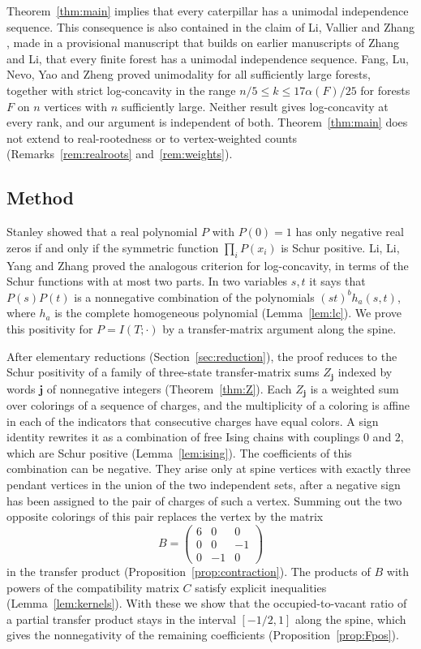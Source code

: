 \documentclass{amsart}
\theoremstyle{definition}
\theoremstyle{remark}
\numberwithin{equation}{section}
\newcommand{\jj}{\mathbf{j}}
\begin{document}
Theorem~\ref{thm:main} implies that every caterpillar has a unimodal independence sequence. This consequence is also contained in the claim of Li, Vallier and Zhang \cite{LVZ}, made in a provisional manuscript that builds on earlier manuscripts of Zhang and Li, that every finite forest has a unimodal independence sequence. Fang, Lu, Nevo, Yao and Zheng \cite{FLNYZ} proved unimodality for all sufficiently large forests, together with strict log-concavity in the range $n/5\le k\le17\alpha(F)/25$ for forests $F$ on $n$ vertices with $n$ sufficiently large. Neither result gives log-concavity at every rank, and our argument is independent of both. Theorem~\ref{thm:main} does not extend to real-rootedness or to vertex-weighted counts (Remarks~\ref{rem:realroots} and~\ref{rem:weights}).

\subsection*{Method}
Stanley \cite[Theorem~2.11]{Sta98} showed that a real polynomial $P$ with $P(0)=1$ has only negative real zeros if and only if the symmetric function $\prod_iP(x_i)$ is Schur positive. Li, Li, Yang and Zhang \cite[Theorem~1.3]{LLYZ} proved the analogous criterion for log-concavity, in terms of the Schur functions with at most two parts. In two variables $s,t$ it says that $P(s)P(t)$ is a nonnegative combination of the polynomials $(st)^bh_a(s,t)$, where $h_a$ is the complete homogeneous polynomial (Lemma~\ref{lem:lc}). We prove this positivity for $P=I(T;\cdot)$ by a transfer-matrix argument along the spine.

After elementary reductions (Section~\ref{sec:reduction}), the proof reduces to the Schur positivity of a family of three-state transfer-matrix sums $Z_\jj$ indexed by words $\jj$ of nonnegative integers (Theorem~\ref{thm:Z}). Each $Z_\jj$ is a weighted sum over colorings of a sequence of charges, and the multiplicity of a coloring is affine in each of the indicators that consecutive charges have equal colors. A sign identity rewrites it as a combination of free Ising chains with couplings $0$ and $2$, which are Schur positive (Lemma~\ref{lem:ising}). The coefficients of this combination can be negative. They arise only at spine vertices with exactly three pendant vertices in the union of the two independent sets, after a negative sign has been assigned to the pair of charges of such a vertex. Summing out the two opposite colorings of this pair replaces the vertex by the matrix
\[
B=\begin{pmatrix}6&0&0\\0&0&-1\\0&-1&0\end{pmatrix}
\]
in the transfer product (Proposition~\ref{prop:contraction}). The products of $B$ with powers of the compatibility matrix $C$ satisfy explicit inequalities (Lemma~\ref{lem:kernels}). With these we show that the occupied-to-vacant ratio of a partial transfer product stays in the interval $[-1/2,1]$ along the spine, which gives the nonnegativity of the remaining coefficients (Proposition~\ref{prop:Fpos}).
\end{document}

